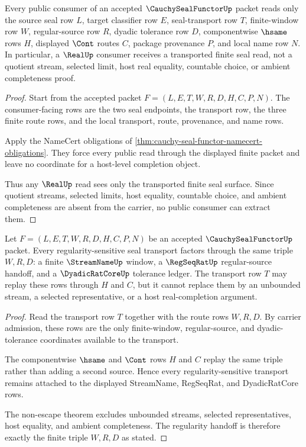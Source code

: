 \begin{theorem}
\label{thm:cauchy-seal-functor-nonescape}
Every public consumer of an accepted $\CauchySealFunctorUp$ packet reads only the source seal row $L$, target classifier row $E$, seal-transport row $T$, finite-window row $W$, regular-source row $R$, dyadic tolerance row $D$, componentwise $\hsame$ rows $H$, displayed $\Cont$ routes $C$, package provenance $P$, and local name row $N$. In particular, a $\RealUp$ consumer receives a transported finite seal read, not a quotient stream, selected limit, host real equality, countable choice, or ambient completeness proof.
\end{theorem}
\begin{proof}
Start from the accepted packet $F=(L,E,T,W,R,D,H,C,P,N)$. The consumer-facing rows are the two seal endpoints, the transport row, the three finite route rows, and the local transport, route, provenance, and name rows.

Apply the NameCert obligations of \autoref{thm:cauchy-seal-functor-namecert-obligations}. They force every public read through the displayed finite packet and leave no coordinate for a host-level completion object.

Thus any $\RealUp$ read sees only the transported finite seal surface. Since quotient streams, selected limits, host equality, countable choice, and ambient completeness are absent from the carrier, no public consumer can extract them.
\end{proof}

\begin{theorem}
\label{thm:cauchy-seal-functor-regularity-handoff}
Let $F=(L,E,T,W,R,D,H,C,P,N)$ be an accepted $\CauchySealFunctorUp$ packet. Every regularity-sensitive seal transport factors through the same triple $W,R,D$: a finite $\StreamNameUp$ window, a $\RegSeqRatUp$ regular-source handoff, and a $\DyadicRatCoreUp$ tolerance ledger. The transport row $T$ may replay these rows through $H$ and $C$, but it cannot replace them by an unbounded stream, a selected representative, or a host real-completion argument.
\end{theorem}
\begin{proof}
Read the transport row $T$ together with the route rows $W,R,D$. By carrier admission, these rows are the only finite-window, regular-source, and dyadic-tolerance coordinates available to the transport.

The componentwise $\hsame$ and $\Cont$ rows $H$ and $C$ replay the same triple rather than adding a second source. Hence every regularity-sensitive transport remains attached to the displayed StreamName, RegSeqRat, and DyadicRatCore rows.

The non-escape theorem excludes unbounded streams, selected representatives, host equality, and ambient completeness. The regularity handoff is therefore exactly the finite triple $W,R,D$ as stated.
\end{proof}

